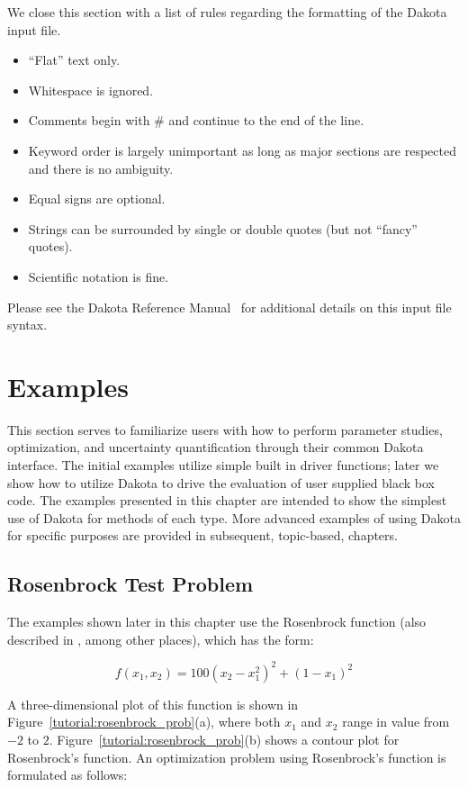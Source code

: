 We close this section with a list of rules regarding the formatting of
the Dakota input file.
\begin{itemize}
\item ``Flat'' text only.
\item Whitespace is ignored.
\item Comments begin with \# and continue to the end of the line.
\item Keyword order is largely unimportant as long as major sections
  are respected and there is no ambiguity.
\item Equal signs are optional.
\item Strings can be surrounded by single or double quotes (but not
  ``fancy'' quotes).
\item Scientific notation is fine.
\end{itemize}
Please see the Dakota Reference Manual~\cite{RefMan} for additional
details on this input file syntax.

\section{Examples}\label{tutorial:examples}

This section serves to familiarize users with how to perform parameter 
studies, optimization, and uncertainty quantification through their common
Dakota interface. The initial examples utilize simple built in driver 
functions; later we show how to utilize Dakota to drive the evaluation of 
user supplied black box code. The examples presented in this chapter 
are intended to show the simplest use of Dakota for methods of 
each type. More advanced examples of using Dakota for specific purposes 
are provided in subsequent, topic-based, chapters.

\subsection{Rosenbrock Test Problem}\label{tutorial:examples:rosenbrock}

The examples shown later in this chapter use the Rosenbrock
function \cite{Rosenbrock60} (also described in \cite{Gil81}, among
other places), which has the form:

\begin{equation}
f(x_1,x_2)=100(x_2-x_1^2)^2+(1-x_1)^2 \label{tutorial:rosen}
\end{equation}

A three-dimensional plot of this function is shown in
Figure~\ref{tutorial:rosenbrock_prob}(a), where both $x_1$ and
$x_2$ range in value from $-2$ to $2$.
Figure~\ref{tutorial:rosenbrock_prob}(b) shows a contour plot
for Rosenbrock's function. An optimization problem using Rosenbrock's
function is formulated as follows:

